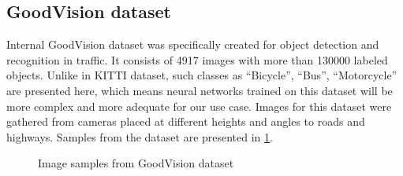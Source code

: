 \documentclass[twoside]{ctuthesis}
\theoremstyle{plain}
\theoremstyle{definition}
\theoremstyle{note}
\begin{document}
\subsection{GoodVision dataset}
Internal GoodVision dataset was specifically created for object detection and recognition in traffic. It consists of 4917 images with more than 130000 labeled objects. Unlike in KITTI dataset, such classes as ``Bicycle'', ``Bus'', ``Motorcycle'' are presented here, which means neural networks trained on this dataset will be more complex and more adequate for our use case.  Images for this dataset were gathered from cameras placed at different heights and angles to roads and highways. Samples from the dataset are presented in \ref{fig:goodvision-samples}.

\begin{figure}[hbt]
        \centering
        
        \centering
                \caption{Image samples from GoodVision dataset}
                \label{fig:goodvision-samples}
\end{figure}
\end{document}
